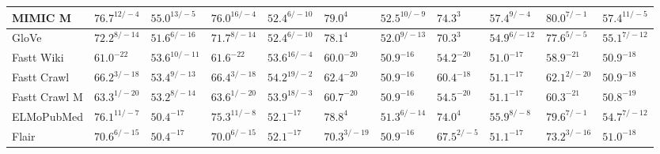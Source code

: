 \documentclass[letterpaper]{article} %
\begin{document}
\begin{table*}[ht]
\begin{tabular}{l l l l l l l l l l l}
MIMIC M & $76.7^{12/-4}$ & $55.0^{13/-5}$ & $76.0^{16/-4}$ & $52.4^{6/-10}$ & $79.0^{4}$ & $52.5^{10/-9}$ & $74.3^{3}$ & $57.4^{9/-4}$ & $80.0^{7/-1}$ & $57.4^{11/-5}$ \\
\midrule
GloVe & $72.2^{8/-14}$ & $51.6^{6/-16}$ & $71.7^{8/-14}$ & $52.4^{6/-10}$ & $78.1^{4}$ & $52.0^{9/-13}$ & $70.3^{3}$ & $54.9^{6/-12}$ & $77.6^{5/-5}$ & $55.1^{7/-12}$ \\
Fastt Wiki & $61.0^{-22}$ & $53.6^{10/-11}$ & $61.6^{-22}$ & $53.6^{16/-4}$ & $60.0^{-20}$ & $50.9^{-16}$ & $54.2^{-20}$ & $51.0^{-17}$ & $58.9^{-21}$ & $50.9^{-18}$ \\
Fastt Crawl & $66.2^{3/-18}$ & $53.4^{9/-13}$ & $66.4^{3/-18}$ & $54.2^{19/-2}$ & $62.4^{-20}$ & $50.9^{-16}$ & $60.4^{-18}$ & $51.1^{-17}$ & $62.1^{2/-20}$ & $50.9^{-18}$ \\
Fastt Crawl M & $63.3^{1/-20}$ & $53.2^{8/-14}$ & $63.6^{1/-20}$ & $53.9^{18/-3}$ & $60.7^{-20}$ & $50.9^{-16}$ & $54.5^{-20}$ & $51.1^{-17}$ & $60.3^{-21}$ & $50.8^{-19}$ \\
\midrule
ELMoPubMed & $76.1^{11/-7}$ & $50.4^{-17}$ & $75.3^{11/-8}$ & $52.1^{-17}$ & $78.8^{4}$ & $51.3^{6/-14}$ & $74.0^{4}$ & $55.9^{8/-8}$ & $79.6^{7/-1}$ & $54.7^{7/-12}$ \\
Flair & $70.6^{6/-15}$ & $50.4^{-17}$ & $70.0^{6/-15}$ & $52.1^{-17}$ & $70.3^{3/-19}$ & $50.9^{-16}$ & $67.5^{2/-5}$ & $51.1^{-17}$ & $73.2^{3/-16}$ & $51.0^{-18}$ \\

\end{tabular}
\end{table*}
\end{document}
